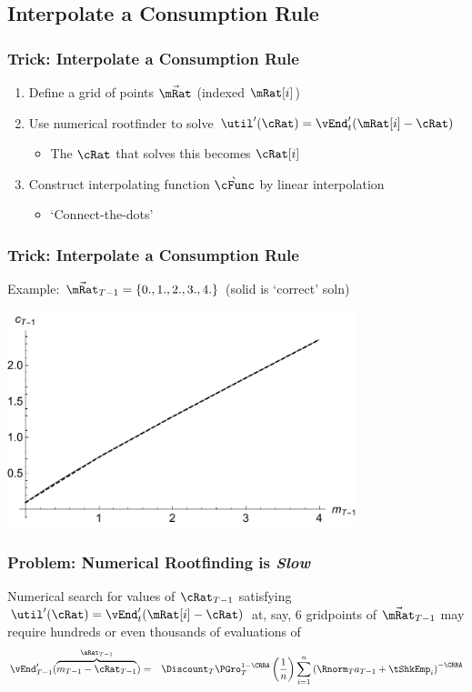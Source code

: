 \documentclass{beamer}
\begin{document}
\subsection{Interpolate a Consumption Rule}
\begin{frame}
\frametitle{Trick: Interpolate a Consumption Rule}

\begin{enumerate}
\item Define a grid of points $\vec{\mRat}$ (indexed $\mRat[i]$)
\item Use numerical rootfinder to solve 
$\util^{\prime}(\cRat) = \vEnd^{\prime}_{t}(\mRat[i]-\cRat)$
\begin{itemize}
\item The $\cRat$ that solves this becomes $\cRat[i]$
\end{itemize}
\item Construct interpolating function $\grave{\cFunc}$ by linear interpolation
\begin{itemize}
\item `Connect-the-dots'
\end{itemize}
\end{enumerate}

\end{frame}

\begin{frame}[label=DiscretizeEqn]
\frametitle{Trick: Interpolate a Consumption Rule}

Example: $\vec{\mRat}_{T-1} = \{0.,1.,2.,3.,4.\}$ (solid is `correct' soln)

\includegraphics[width=4.0in]{./Figures/PlotcTm1Simple.pdf}

\end{frame}

\begin{frame}[label=vEndtSlow]
\frametitle{Problem: Numerical Rootfinding is {\it Slow}}

Numerical search for values of $\cRat_{T-1}$ satisfying
$\util^{\prime}(\cRat) = \vEnd^{\prime}_{t}(\mRat[i]-\cRat)$ at, say,
6 gridpoints of $\vec{\mRat}_{T-1}$ may require hundreds or even thousands of
evaluations of
\begin{eqnarray}
        \vEnd^{\prime}_{T-1}(\overbrace{{m}_{T-1}-{\cRat}_{T-1}}^{\aRat_{T-1}}) & = &   \Discount_{T} \PGro_{T}^{1-\CRRA}\left(\frac{1}{n}\right)\sum_{i=1}^{n}   \left( \Rnorm_{T} {a}_{T-1} + \tShkEmp_{i}\right)^{-\CRRA} \notag
\end{eqnarray}

\end{frame}
\end{document}

